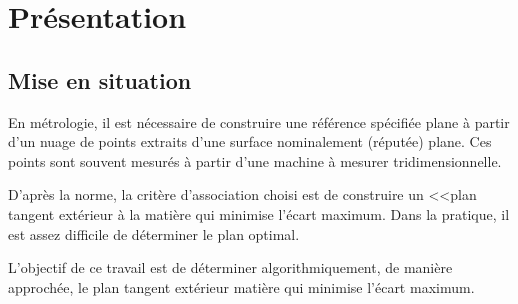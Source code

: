\documentclass[10pt,fleqn]{article} %
\begin{document}

\vspace{2cm}
\pagestyle{fancy}
\thispagestyle{plain}

\section{Présentation}
\subsection{Mise en situation}
\ifprof
\else
En métrologie, il est nécessaire de construire une référence spécifiée plane à partir d'un nuage de points extraits d'une surface nominalement (réputée) plane. Ces points sont souvent mesurés à partir d'une machine à mesurer tridimensionnelle.

D'après la norme, la critère d'association choisi est de construire un <<plan tangent extérieur à la matière qui minimise l'écart maximum. Dans la pratique, il est assez difficile de déterminer le plan optimal. 

\begin{obj}
L'objectif de ce travail est de déterminer algorithmiquement, de manière approchée, le plan tangent extérieur matière qui minimise l'écart maximum. 
\end{obj}
\fi
\end{document}
